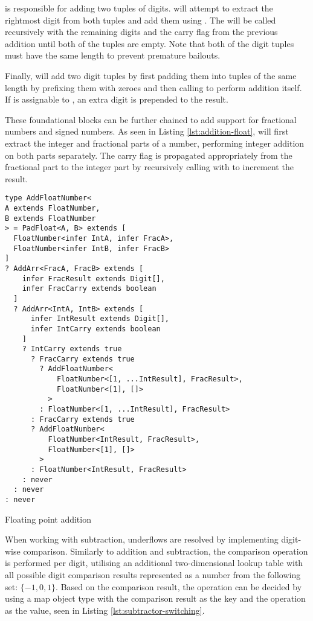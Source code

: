  is responsible for adding two tuples of digits.  will attempt to extract the rightmost digit from both tuples and add them using . The  will be called recursively with the remaining digits and the carry flag from the previous addition until both of the tuples are empty. Note that both of the digit tuples must have the same length to prevent premature bailouts.

Finally,  will add two digit tuples by first padding them into tuples of the same length by prefixing them with zeroes and then calling  to perform addition itself. If  is assignable to , an extra  digit is prepended to the result.

These foundational blocks can be further chained to add support for fractional numbers and signed numbers. As seen in Listing \ref{lst:addition-float},  will first extract the integer and fractional parts of a number, performing integer addition on both parts separately. The carry flag is propagated appropriately from the fractional part to the integer part by recursively calling  with \vcode{[1]} to increment the result.

\begin{listing}[ht!]
  \begin{verbatim}
type AddFloatNumber<
A extends FloatNumber,
B extends FloatNumber
> = PadFloat<A, B> extends [
  FloatNumber<infer IntA, infer FracA>,
  FloatNumber<infer IntB, infer FracB>
]
? AddArr<FracA, FracB> extends [
    infer FracResult extends Digit[],
    infer FracCarry extends boolean
  ]
  ? AddArr<IntA, IntB> extends [
      infer IntResult extends Digit[],
      infer IntCarry extends boolean
    ]
    ? IntCarry extends true
      ? FracCarry extends true
        ? AddFloatNumber<
            FloatNumber<[1, ...IntResult], FracResult>,
            FloatNumber<[1], []>
          >
        : FloatNumber<[1, ...IntResult], FracResult>
      : FracCarry extends true
      ? AddFloatNumber<
          FloatNumber<IntResult, FracResult>,
          FloatNumber<[1], []>
        >
      : FloatNumber<IntResult, FracResult>
    : never
  : never
: never
\end{verbatim}
  \caption{Floating point addition}\label{lst:addition-float}
\end{listing}

When working with subtraction, underflows are resolved by implementing digit-wise comparison. Similarly to addition and subtraction, the comparison operation is performed per digit, utilising an additional two-dimensional lookup table with all possible digit comparison results represented as a number from the following set: $\{ -1, 0, 1 \}$. Based on the comparison result, the operation can be decided by using a map object type with the comparison result as the key and the operation as the value, seen in Listing \ref{lst:subtractor-switching}.

